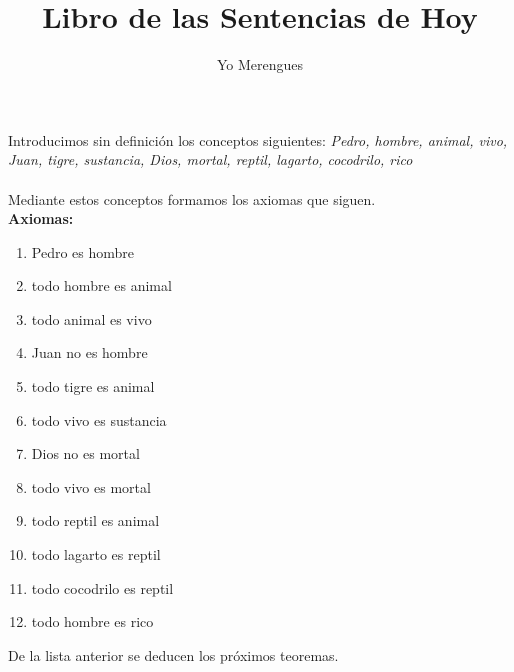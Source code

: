 ﻿\documentclass[12pt]{book}
\title{Libro de las Sentencias de Hoy}
\author{Yo Merengues}
\date{}
\begin{document}
\maketitle
 Introducimos sin definición los conceptos siguientes: \textit{
Pedro, hombre, animal, vivo, Juan, tigre, sustancia, Dios, mortal, reptil, lagarto, cocodrilo, rico}
\\
\\Mediante estos conceptos formamos los axiomas que siguen. \\
\textbf{Axiomas:}
\begin{enumerate}
\item Pedro es hombre
\item todo hombre es animal
\item todo animal es vivo
\item Juan no es hombre
\item todo tigre es animal
\item todo vivo es sustancia
\item Dios no es mortal
\item todo vivo es mortal
\item todo reptil es animal
\item todo lagarto es reptil
\item todo cocodrilo es reptil
\item todo hombre es rico
\end{enumerate}De la lista anterior se deducen los próximos teoremas. \\
\end{document}
